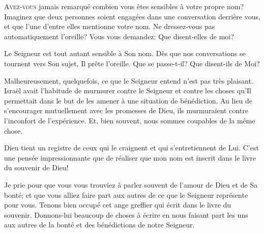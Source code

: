 \dvrule







\lettrine{A}{vez-vous} jamais remarqué combien vous êtes sensibles
 à votre propre nom? Imaginez que deux personnes soient engagées
 dans une conversation derrière vous, et que l'une d'entre elles
 mentionne votre nom. Ne dressez-vous pas automatiquement l'oreille?
 Vous vous demandez:  \Og Que disent-elles de moi? \Fg{}

Le Seigneur est tout autant sensible à Son nom. Dès que nos conversations
 se tournent vers Son sujet, Il prête l'oreille.
 \Og Que se passe-t-il? Que disent-ils de Moi? \Fg{}

Malheureusement, quelquefois, ce que le Seigneur entend n'est pas très
 plaisant. Israël avait l'habitude de murmurer contre le Seigneur
 et contre les choses qu'Il permettait dans le but de les amener
 à une situation de bénédiction. Au lieu de s'encourager mutuellement
 avec les promesses de Dieu, ils murmuraient contre l'inconfort
 de l'expérience. Et, bien souvent, nous sommes coupables de la même chose. 


Dieu tient un registre de ceux qui le craignent et qui s'entretiennent de Lui.
 C'est une pensée impressionnante que de réaliser que mon nom est inscrit
 dans le livre du souvenir de Dieu! 

Je prie pour que vous vous trouviez à parler souvent de l'amour de Dieu
 et de Sa bonté; et que vous alliez faire part aux autres de ce que
 le Seigneur représente pour vous. Tenons bien occupé cet
 \Og ange greffier \Fg{} qui écrit dans le livre du souvenir.
 Donnons-lui beaucoup de choses à écrire en nous faisant part les uns
 aux autres de la bonté et des bénédictions de notre Seigneur. 


